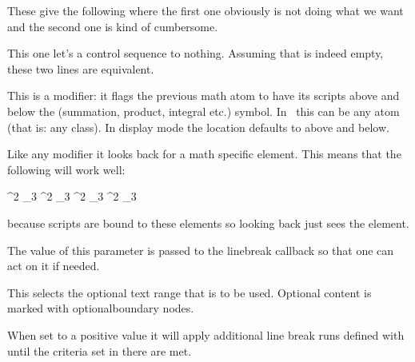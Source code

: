 These give the following where the first one obviously is not doing what we want
and the second one is kind of cumbersome.

\startlines
\getbuffer
\stoplines

\stopnewprimitive

\startnewprimitive[title={\prm {lettonothing}}]

This one let's a control sequence to nothing. Assuming that \type {\empty}
is indeed empty, these two lines are equivalent.

\starttyping
\let         \foo\empty
{}\oof
\stoptyping

\stopnewprimitive

\startoldprimitive[title={\prm {limits}}]

This is a modifier: it flags the previous math atom to have its scripts above and
below the (summation, product, integral etc.) symbol. In \LUAMETATEX\ this can be
any atom (that is: any class). In display mode the location defaults to above and
below.

Like any modifier it looks back for a math specific element. This means that the
following will work well:

\starttyping
\sum \limits ^2 _3
\sum ^2 \limits _3
\sum ^2 _3 \limits
\sum ^2 _3 \limits \nolimits \limits
\stoptyping

because scripts are bound to these elements so looking back just sees the element.

\stopoldprimitive

\startnewprimitive[title={\prm {linebreakchecks}}]

The value of this parameter is passed to the linebreak callback so that one can
act on it if needed.

\stopnewprimitive

\startnewprimitive[title={\prm {linebreakoptional}}]

This selects the optional text range that is to be used. Optional content is
marked with {optionalboundary} nodes.

\stopnewprimitive

\startnewprimitive[title={\prm {linebreakpasses}}]

When set to a positive value it will apply additional line break runs defined
with  until the criteria set in there are met.

\stopnewprimitive

\startnewprimitive[title={\prm {linedirection}}]

